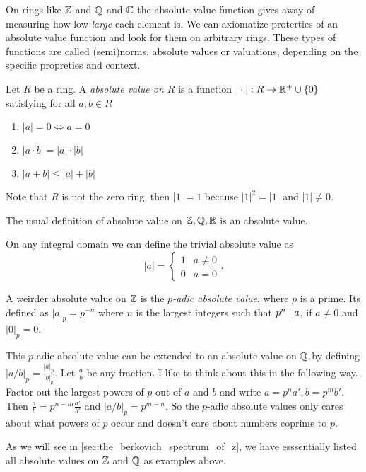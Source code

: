 On rings like $\mathbb{Z}$ and $\mathbb{Q}$ and $\mathbb{C}$ the absolute value function gives away of measuring how low \emph{large} each element is. 
We can axiomatize proterties of an absolute value function and look for them on arbitrary rings. 
These types of functions are called (semi)norms, absolute values or valuations, depending on the specific propreties and context.  
\begin{definition}
	Let $R$ be a ring. A \emph{absolute value on $R$} is a function $|\cdot |: R \to \mathbb{R}^{+} \cup \{0\} $ satisfying for all $a, b \in R$
	\begin{enumerate}
		\item $|a| = 0 \iff a = 0$ 
		\item $|a \cdot b| = |a| \cdot |b|$ 
		\item $|a + b| \le |a| + |b|$
	\end{enumerate}
\end{definition}
Note that $R$ is not the zero ring, then $|1| = 1$ because $|1|^2 = |1| $ and $|1|\ne 0 $. 
\begin{example}
	The usual definition of absolute value on $\mathbb{Z}, \mathbb{Q}, \mathbb{R}$ is an absolute value. 
\end{example}
\begin{example}
	On any integral domain we can define the trivial absolute value as \[
	 |a| = \begin{cases}
		 1 & a \ne 0 \\
		 0 & a = 0
	 \end{cases}
	.\] 
\end{example}
\begin{example}
	A weirder absolute value on $\mathbb{Z}$ is the \emph{$p$-adic absolute value}, where $p$ is a prime. 
	Its defined as $|a|_p = p^{-n}$ where $n$ is the largest integers such that $p^{n} \mid a$, if $a \ne 0$ and $|0|_p = 0$. 


	This $p$-adic absolute value can be extended to an absolute value on $\mathbb{Q}$ by defining $|a / b|_p = \frac{|a|_p}{|b|_p}$. Let $\frac{a}{b}$ be any fraction. 
	I like to think about this in the following way. 
	Factor out the largest powers of $p$ out of $a$ and $b$ and write $a = p^{n} a', b = p^{m} b'$. Then $\frac{a}{ b} = p^{n - m} \frac{a'}{ b'}$ and $|a / b|_p = p^{m - n}$. 
	So the $p$-adic absolute values only cares about what powers of $p$ occur and doesn't care about numbers coprime to $p $.
\end{example}
As we will see in \cref{sec:the_berkovich_spectrum_of_z}, we have esssentially listed all absolute values on $\mathbb{Z}$ and $\mathbb{Q}$ as examples above.  

